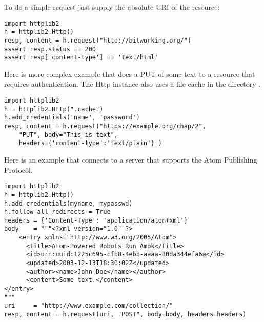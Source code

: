 To do a simple  request just supply the absolute URI
of the resource:

\begin{verbatim}
import httplib2
h = httplib2.Http()
resp, content = h.request("http://bitworking.org/")
assert resp.status == 200
assert resp['content-type'] == 'text/html'
\end{verbatim}

Here is more complex example that does a PUT 
of some text to a resource that requires authentication.
The Http instance also uses a file cache
in the directory . 

\begin{verbatim}
import httplib2
h = httplib2.Http(".cache")
h.add_credentials('name', 'password')
resp, content = h.request("https://example.org/chap/2", 
    "PUT", body="This is text", 
    headers={'content-type':'text/plain'} )
\end{verbatim}

Here is an example that connects to a server that 
supports the Atom Publishing Protocol.

\begin{verbatim}
import httplib2
h = httplib2.Http()
h.add_credentials(myname, mypasswd)
h.follow_all_redirects = True
headers = {'Content-Type': 'application/atom+xml'}
body    = """<?xml version="1.0" ?>
    <entry xmlns="http://www.w3.org/2005/Atom">
      <title>Atom-Powered Robots Run Amok</title>
      <id>urn:uuid:1225c695-cfb8-4ebb-aaaa-80da344efa6a</id>
      <updated>2003-12-13T18:30:02Z</updated>
      <author><name>John Doe</name></author>
      <content>Some text.</content>
</entry>
"""
uri     = "http://www.example.com/collection/"
resp, content = h.request(uri, "POST", body=body, headers=headers)
\end{verbatim}


